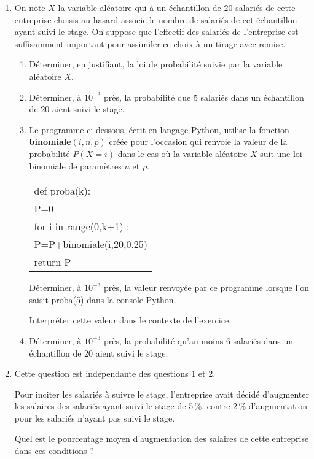 \documentclass[10pt,a4paper]{article}
\begin{document}
\begin{enumerate}[resume]
\item On note $X$ la variable aléatoire qui à un échantillon de $20$ salariés de cette entreprise choisis au hasard associe le nombre de salariés de cet échantillon ayant suivi le stage. On suppose que l'effectif des salariés de l'entreprise est suffisamment important pour assimiler ce choix à un tirage avec remise.
	\begin{enumerate}
		\item Déterminer, en justifiant, la loi de probabilité suivie par la variable aléatoire $X$.
		\item Déterminer, à $10^{-3}$ près, la probabilité que $5$ salariés dans un échantillon de $20$ aient suivi le stage.
		\item Le programme ci-dessous, écrit en langage Python, utilise la fonction \textbf{binomiale$(i, n, p)$} créée pour l'occasion qui renvoie la valeur de la probabilité $P(X = i)$ dans le cas où la variable aléatoire $X$ suit une loi binomiale de paramètres $n$ et $p$.

\begin{center}
\begin{tabular}{|l|}\hline
def proba(k):\\
\quad  P=0\\
\quad for i in range(0,k+1) :\\
\qquad P=P+binomiale(i,20,0.25)\\
\quad return P\\ \hline
\end{tabular}
\end{center}

Déterminer, à $10^{-3}$ près, la valeur renvoyée par ce programme lorsque l'on saisit proba(5) dans la console Python.

Interpréter cette valeur dans le contexte de l'exercice.
		\item Déterminer, à $10^{-3}$ près, la probabilité qu'au moins $6$ salariés dans un échantillon de $20$ aient suivi le stage.
		\end{enumerate}	
\item Cette question est indépendante des questions 1 et 2.

Pour inciter les salariés à suivre le stage, l'entreprise avait décidé d'augmenter les salaires des salariés ayant suivi le stage de 5\,\%, contre 2\,\% d'augmentation pour les salariés n'ayant pas suivi le stage. 

Quel est le pourcentage moyen d'augmentation des salaires de cette entreprise dans ces conditions ?

\end{enumerate}
\end{document}
